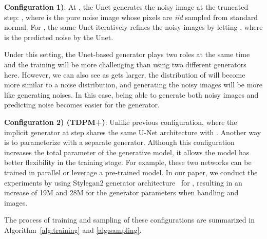 \documentclass{article} \usepackage{iclr2023_conference,times}
\theoremstyle{plain}
\theoremstyle{definition}
\theoremstyle{remark}
\begin{document}
{\textbf{Configuration 1)}: At , the Unet generates the noisy image at the truncated step: , where  is the pure noise image whose pixels are \textit{iid} sampled from  standard normal. For , the same Unet iteratively refines the noisy images by letting , where   is the predicted noise by the Unet. 

Under this setting, the Unet-based generator plays two roles at the same time and the training will be more challenging than using two different generators here. However, we can also see as  gets larger, the distribution of  will become more similar to a noise distribution, and generating the noisy images will be more like generating noises. In this case, being able to generate both noisy images and predicting noise becomes easier for the generator. 

\textbf{Configuration 2) (TDPM+)}: 
Unlike previous configuration, where the implicit generator at step  shares the same  U-Net architecture with . Another way is to parameterize  with a separate generator. Although this configuration increases the total parameter of the generative model, it allows the model has better flexibility in the training stage. For example, these two networks can be trained in parallel or leverage a pre-trained model. In our paper, we conduct the experiments by using Stylegan2 generator architecture~\cite{karras2020analyzing} for , resulting in an increase of 19M and 28M for the generator parameters when handling  and  images. 


The process of training and sampling of these configurations are summarized in Algorithm~\ref{alg:training} and \ref{alg:sampling}.

}
\end{document}
